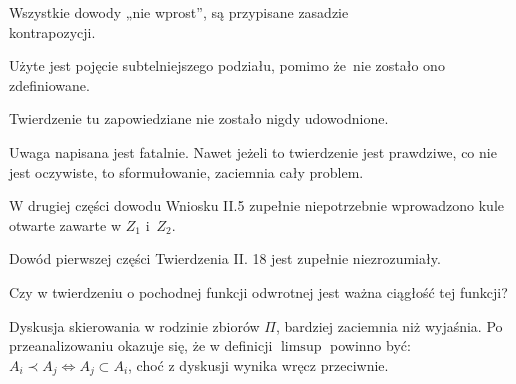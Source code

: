 \documentclass[a4paper,11pt]{article}
\numberwithin{equation}{section}
\begin{document}
\VerSpaceFour








\noindent
{} Wszystkie dowody „nie wprost”, są przypisane
zasadzie \\
kontrapozycji.

\VerSpaceFour





\noindent
{} Użyte jest pojęcie subtelniejszego podziału, pomimo że~nie zostało
ono zdefiniowane.

\VerSpaceFour





\noindent
{} Twierdzenie tu zapowiedziane nie zostało nigdy udowodnione.

\VerSpaceFour





\noindent
{} Uwaga napisana jest fatalnie. Nawet jeżeli to twierdzenie jest
prawdziwe, co nie jest oczywiste, to sformułowanie, zaciemnia cały problem.

\VerSpaceFour





\noindent
{} W drugiej części dowodu Wniosku II.5 zupełnie niepotrzebnie
wprowadzono kule otwarte zawarte w $Z_{ 1 }$ i~$Z_{ 2 }$.

\VerSpaceFour





\noindent
{} Dowód pierwszej części Twierdzenia II. 18 jest zupełnie
niezrozumiały.

\VerSpaceFour





\noindent
{} Czy w twierdzeniu o pochodnej funkcji odwrotnej jest ważna
ciągłość tej funkcji?

\VerSpaceFour





\noindent
{} Dyskusja skierowania w rodzinie zbiorów $\Pi$,
bardziej zaciemnia niż wyjaśnia. Po przeanalizowaniu okazuje się, że w
definicji $\limsup$ powinno być: \\
$A_{ i } \prec A_{ j } \Leftrightarrow A_{ j } \subset A_{ i }$, choć z
dyskusji wynika wręcz przeciwnie.
\end{document}
